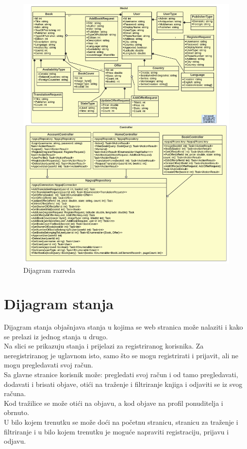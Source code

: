 			\begin{figure}[h]
				\centering
				\includegraphics[width = \textwidth]{slike/dijagramKlasa.PNG}
				\caption{Dijagram razreda}
				\label{fig:razredi}
			\end{figure}
			
			\clearpage
		
		\section{Dijagram stanja}
			
			
			Dijagram stanja objašnjava stanja u kojima se web stranica može nalaziti i kako se prelazi iz jednog stanja u drugo.\\
			Na slici se prikazuju stanja i prijelazi za registriranog korisnika. Za neregistriranog je uglavnom isto, samo što se mogu registrirati i prijavit, ali  ne mogu pregledavati svoj račun.\\
			Sa glavne stranice korisnik može: pregledati svoj račun i od tamo pregledavati, dodavati i brisati objave, otići na traženje i filtriranje knjiga i odjaviti se iz svog računa.\\
			Kod tražilice se može otići na objavu, a kod objave na profil ponuditelja i obrnuto. \\
			U bilo kojem trenutku se može doći na početnu stranicu, stranicu za traženje i filtriranje i u bilo kojem trenutku je moguće napraviti registraciju, prijavu i odjavu.

